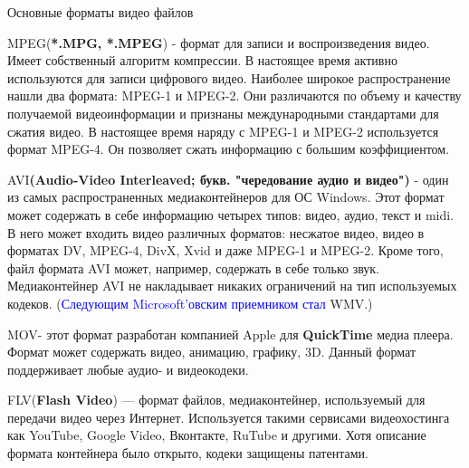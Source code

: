 \documentclass[aspectratio=169]{beamer}
\newcommand{\blu}{\textcolor{blue}}
\newcommand{\zag}{\huge\alert}
\newcommand{\n}{\normalsize}
\begin{document}
\begin{frame}[shrink=32]{Основные форматы видео файлов}


    \zag{MPEG}\n (\textbf{*.MPG, *.MPEG}) - формат для записи и воспроизведения видео. Имеет собственный алгоритм компрессии. В настоящее время активно используются для записи цифрового видео. Наиболее широкое распространение нашли два формата: \alert{MPEG-1} и \alert{MPEG-2}. Они различаются по объему и качеству получаемой видеоинформации и признаны междуна­родными стандартами для сжатия видео. В настоящее время наряду с \alert{MPEG-1} и \alert{MPEG-2} используется формат \alert{MPEG-4}. Он позволяет сжать информацию с большим коэффициентом.
    
    \vspace{10pt}
 
    \zag{AVI}\n \textbf{(Audio-Video Interleaved; букв. "чередование аудио и видео")} - один из самых распространенных медиаконтейнеров для ОС Windows. Этот формат может содержать в себе информацию четырех типов: видео, аудио, текст и \alert{midi}. В него может входить видео различных форматов: несжатое видео, видео в форматах \alert{DV}, MPEG-4, DivX, Xvid и даже MPEG-1 и MPEG-2. Кроме того, файл формата AVI может, например, содержать в себе только звук. Медиаконтейнер \alert{AVI} не накладывает никаких ограничений на тип используемых кодеков. (\blu{Следующим Microsoft'овским приемником стал} \alert{WMV}.)
    
    \vspace{10pt}
    
    \zag{MOV}\n - этот формат разработан компанией Apple для \textbf{QuickTime} медиа плеера. Формат может содержать видео, анимацию, графику, 3D. Данный формат поддерживает любые аудио- и видеокодеки.
    
    \vspace{10pt}
    
    \zag{FLV}\n (\textbf{Flash Video}) — формат файлов, медиаконтейнер, используемый для передачи видео через Интернет. Используется такими сервисами видеохостинга как YouTube, Google Video, Вконтакте, RuTube и другими. Хотя описание формата контейнера было открыто, кодеки защищены патентами.

\end{frame}
\end{document}
